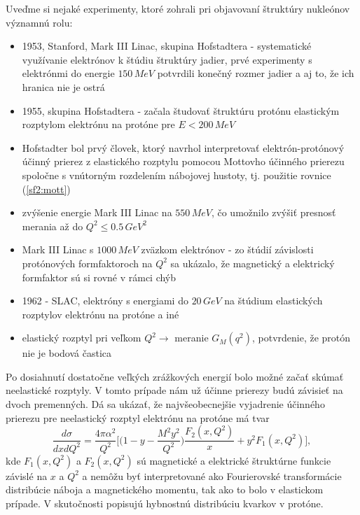 \documentclass[../../main.tex]{subfiles}
\begin{document}
Uveďme si nejaké experimenty, ktoré zohrali pri objavovaní štruktúry nukleónov významnú rolu:
\begin{itemize}
\item 1953, Stanford, Mark III Linac, skupina Hofstadtera  - systematické využívanie elektrónov k štúdiu štruktúry jadier, prvé experimenty s elektrónmi do energie $150\,\unit{MeV}$ potvrdili konečný rozmer jadier a aj to, že ich hranica nie je ostrá
\item 1955, skupina Hofstadtera - začala študovať štruktúru protónu elastickým rozptylom elektrónu na protóne pre $E < 200\,\unit{MeV}$
\item Hofstadter bol prvý človek, ktorý navrhol interpretovať elektrón-protónový účinný prierez z elastického rozptylu pomocou Mottovho účinného prierezu spoločne s vnútorným rozdelením nábojovej hustoty, tj. použitie rovnice (\ref{sf2:mott})
\item zvýšenie energie Mark III Linac na $550\,\unit{MeV}$, čo umožnilo zvýšiť presnosť merania až do $Q^2 \leq 0.5\,\unit{GeV^2}$
\item Mark III Linac s $1000\,\unit{MeV}$ zväzkom elektrónov - zo štúdií závislosti protónových formfaktoroch na $Q^2$ sa ukázalo, že magnetický a elektrický formfaktor sú si rovné v rámci chýb
\item 1962 - SLAC, elektróny s energiami do $20\,\unit{GeV}$ na štúdium elastických rozptylov elektrónu na protóne a iné
\item elastický rozptyl pri veľkom $Q^2 \rightarrow$ meranie $G_M(q^2)$, potvrdenie, že protón nie je bodová častica 
\end{itemize}

Po dosiahnutí dostatočne veľkých zrážkových energií bolo možné začať skúmať neelastické rozptyly. V tomto prípade nám už účinne prierezy budú závisieť na dvoch premenných. Dá sa ukázať, že najvšeobecnejšie vyjadrenie účinného prierezu pre neelastický rozptyl elektrónu na protóne má tvar
\begin{equation}
\frac{d\sigma}{dxdQ^2} = \frac{4\pi\alpha^2}{Q^2} \bigg[\bigg( 1-y-\frac{M^2y^2}{Q^2}\bigg)\frac{F_2(x,Q^2)}{x} +y^2F_1(x,Q^2) \bigg],
\label{sf2:blalbla}
\end{equation}
kde $F_1(x,Q^2)$ a $F_2(x,Q^2)$ sú magnetické a elektrické štruktúrne funkcie závislé na $x$ a $Q^2$ a nemôžu byť interpretované ako Fourierovské transformácie distribúcie náboja a magnetického momentu, tak ako to bolo v elastickom prípade. V skutočnosti popisujú hybnostnú distribúciu kvarkov v protóne.
\end{document}
